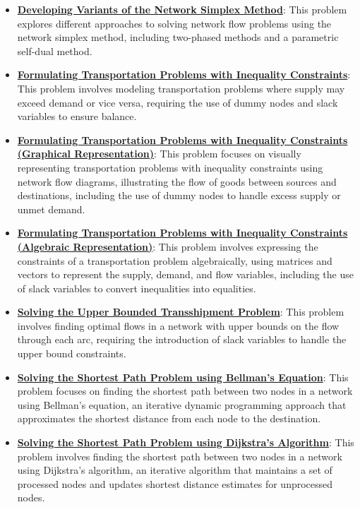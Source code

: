 \documentclass{article}%
\begin{document}
\begin{itemize}[leftmargin=*]
\item \href{https://www.math.purdue.edu/~yipn/421/2024-11-07-NetSimplex.pdf#page=45}{\textbf{Developing Variants of the Network Simplex Method}}: This problem explores different approaches to solving network flow problems using the network simplex method, including two-phased methods and a parametric self-dual method. %
\item \href{https://www.math.purdue.edu/~yipn/421/2024-11-14-NetAppls.pdf#page=1}{\textbf{Formulating Transportation Problems with Inequality Constraints}}: This problem involves modeling transportation problems where supply may exceed demand or vice versa, requiring the use of dummy nodes and slack variables to ensure balance. %
\item \href{https://www.math.purdue.edu/~yipn/421/2024-11-14-NetAppls.pdf#page=5}{\textbf{Formulating Transportation Problems with Inequality Constraints (Graphical Representation)}}: This problem focuses on visually representing transportation problems with inequality constraints using network flow diagrams, illustrating the flow of goods between sources and destinations, including the use of dummy nodes to handle excess supply or unmet demand. %
\item \href{https://www.math.purdue.edu/~yipn/421/2024-11-14-NetAppls.pdf#page=6}{\textbf{Formulating Transportation Problems with Inequality Constraints (Algebraic Representation)}}: This problem involves expressing the constraints of a transportation problem algebraically, using matrices and vectors to represent the supply, demand, and flow variables, including the use of slack variables to convert inequalities into equalities. %
\item \href{https://www.math.purdue.edu/~yipn/421/2024-11-14-NetAppls.pdf#page=9}{\textbf{Solving the Upper Bounded Transshipment Problem}}: This problem involves finding optimal flows in a network with upper bounds on the flow through each arc, requiring the introduction of slack variables to handle the upper bound constraints. %
\item \href{https://www.math.purdue.edu/~yipn/421/2024-11-14-NetAppls.pdf#page=16}{\textbf{Solving the Shortest Path Problem using Bellman's Equation}}: This problem focuses on finding the shortest path between two nodes in a network using Bellman's equation, an iterative dynamic programming approach that approximates the shortest distance from each node to the destination. %
\item \href{https://www.math.purdue.edu/~yipn/421/2024-11-14-NetAppls.pdf#page=20}{\textbf{Solving the Shortest Path Problem using Dijkstra's Algorithm}}: This problem involves finding the shortest path between two nodes in a network using Dijkstra's algorithm, an iterative algorithm that maintains a set of processed nodes and updates shortest distance estimates for unprocessed nodes. %

\end{itemize}
\end{document}
